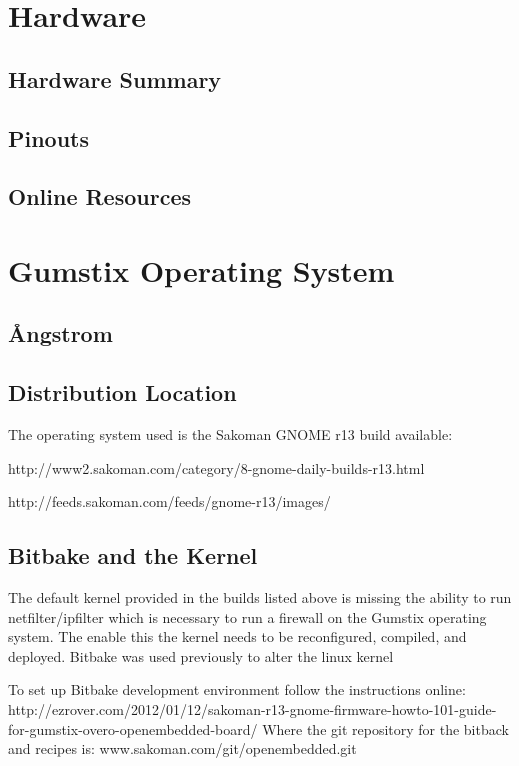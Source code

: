 \section{Hardware}

\subsection{Hardware Summary}

\subsection{Pinouts}

\subsection{Online Resources}

\section{Gumstix Operating System}

\subsection{\r{A}ngstrom}

\subsection{Distribution Location}

The operating system used is the Sakoman GNOME r13 build available:

http://www2.sakoman.com/category/8-gnome-daily-builds-r13.html

http://feeds.sakoman.com/feeds/gnome-r13/images/

\subsection{Bitbake and the Kernel}

The default kernel provided in the builds listed above is missing the ability to run netfilter/ipfilter which is necessary to run a firewall on the Gumstix operating system.
The enable this the kernel needs to be reconfigured, compiled, and deployed.
Bitbake was used previously to alter the linux kernel

To set up Bitbake development environment follow the instructions online: http://ezrover.com/2012/01/12/sakoman-r13-gnome-firmware-howto-101-guide-for-gumstix-overo-openembedded-board/
Where the git repository for the bitback and recipes is: www.sakoman.com/git/openembedded.git

